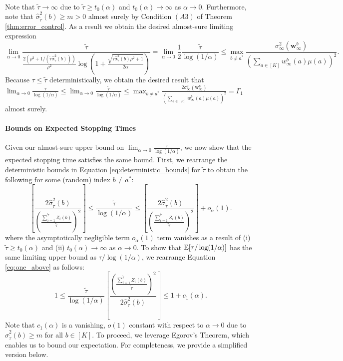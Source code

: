 \documentclass{article}
\begin{document}
\begin{appendices}
\begin{align}
\end{align}
Note that $\tilde{\tau} \rightarrow \infty$ due to $\tilde{\tau} \geq t_0(\alpha)$ and $t_0(\alpha) \rightarrow \infty$ as $\alpha \rightarrow 0$. Furthermore, note that $\hat\sigma_{\tilde\tau}^2(b) \geq m > 0$ almost surely by Condition $(A3)$ of Theorem \ref{thm:error_control}. As a result we obtain the desired almost-sure limiting expression
\begin{equation}
    \lim_{\alpha \rightarrow 0}\frac{\tilde\tau}{{ \frac{2(\rho^2 + 1/(\tilde{\tau}\hat\sigma^2_{\tilde{\tau}}(b ) ))}{\rho^2} \log\left( 1+ \frac{\sqrt{\tilde\tau \hat\sigma^2_{\tilde{\tau}}(b )\rho^2 + 1 }}{2\alpha}\right)}} = \lim_{\alpha \rightarrow 0}\frac{1}{2}\frac{\tilde\tau}{\log(1/\alpha)} \leq  \max_{b \neq a^*}\frac{\sigma_\infty^2(\bm{w}_\infty^b)}{\left(\sum_{a \in [K]}w_\infty^b(a)\mu(a)\right)^2}.
\end{equation}
Because $\tau \leq \tilde{\tau}$ deterministically, we obtain the desired result that $\lim_{\alpha \rightarrow 0} \frac{\tau}{\log(1/\alpha)} \leq \lim_{\alpha \rightarrow 0} \frac{\tilde\tau}{\log(1/\alpha)} \leq \max_{b\neq a^*} \frac{2\sigma_\infty^2(\bm{w}_\infty^b)}{\left(\sum_{a \in [K]}w_\infty^b(a)\mu(a)\right)^2} = \Gamma_1$ almost surely. 

\paragraph{Bounds on Expected Stopping Times}
Given our almost-sure upper bound on $\lim_{\alpha \rightarrow 0} \frac{\tau}{\log(1/\alpha)}$, we now show that the expected stopping time satisfies the same bound. First, we rearrange the deterministic bounds in Equation \eqref{eq:deterministic_bounds} for $\tilde{\tau}$ to obtain the following for some (random) index $b \neq a^*$:
\begin{equation}\label{eq:one_above}
    \left[\frac{2 \hat\sigma_{\tilde\tau}^2(b)}{\left(\frac{\sum_{i=1}^{\tilde\tau}{Z}_i(b)}{\tilde\tau}\right)^2}\right]\leq \frac{\tilde{\tau}}{\log(1/\alpha)} \leq \left[\frac{2 \hat\sigma_{\tilde\tau}^2(b)}{\left(\frac{\sum_{i=1}^{\tilde\tau}{Z}_i(b)}{\tilde\tau}\right)^2}\right] + o_\alpha(1). 
\end{equation}
where the asymptotically negligible term $o_{\alpha}(1)$ term vanishes as a result of (i) $\tilde{\tau} \geq t_0(\alpha)$ and (ii) $t_0(\alpha) \rightarrow \infty$ as $\alpha \rightarrow 0$. To show that $\mathbb{E}[\tau/\log(1/\alpha)]$ has the same limiting upper bound as $\tau/\log(1/\alpha)$, we rearrange Equation \eqref{eq:one_above} as follows:
\begin{equation}\label{eq:one_more_above}
    1 \leq  \frac{\tilde{\tau}}{\log(1/\alpha)}\left[\frac{\left(\frac{\sum_{i=1}^{\tilde\tau}{Z}_i(b)}{\tilde\tau}\right)^2}{2 \hat\sigma_{\tilde\tau}^2(b)}\right] \leq 1+ c_1(\alpha).
\end{equation}
Note that $c_1(\alpha)$ is a vanishing, $o(1)$ constant with respect to $\alpha \rightarrow 0$ due to $\hat\sigma_{\tilde{\tau}}^2(b) \geq m$ for all $b \in [K]$. To proceed, we leverage Egorov's Theorem, which enables us to bound our expectation. For completeness, we provide a simplified version below. 


\end{appendices}
\end{document}
